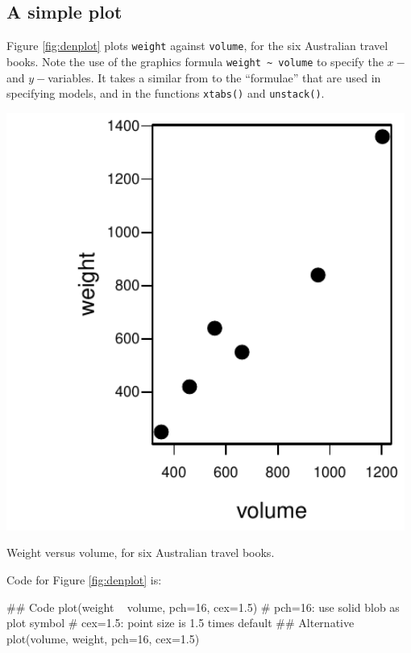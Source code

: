 \documentclass{tufte-book}\usepackage[]{graphicx}\usepackage[]{color}
\newcommand{\txtt}[1]{\texttt{#1}}
\begin{document}
\subsection*{A simple plot}
Figure \ref{fig:denplot} plots \txtt{weight} against \txtt{volume},
for the six Australian travel books.  Note the use of the graphics
formula \verb!weight ~ volume! to specify the $x-$ and
$y-$variables. It takes a similar from to the ``formulae'' that are
used in specifying models, and in the functions \txtt{xtabs()} and
\txtt{unstack()}.
\begin{marginfigure}
\begin{Schunk}


\centerline{\includegraphics[width=0.98\textwidth]{../figs/02-denplot-1} }

\end{Schunk}
 \caption{Weight versus volume, for six Australian travel
books.}\label{fig:denplot}
\end{marginfigure}

Code for Figure \ref{fig:denplot} is:
\begin{Schunk}
\begin{Sinput}
## Code
plot(weight ~ volume, pch=16, cex=1.5)
  # pch=16: use solid blob as plot symbol
  # cex=1.5: point size is 1.5 times default
## Alternative
plot(volume, weight, pch=16, cex=1.5)
\end{Sinput}
\end{Schunk}
\end{document}
